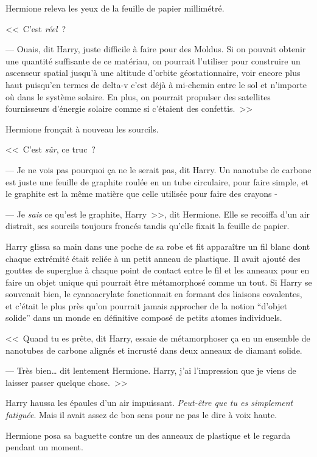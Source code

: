 Hermione releva les yeux de la feuille de papier millimétré.

<<~C'est \emph{réel}~?

--- Ouais, dit Harry, juste difficile à faire pour des Moldus. Si on pouvait obtenir une quantité suffisante de ce matériau, on pourrait l'utiliser pour construire un ascenseur spatial jusqu'à une altitude d'orbite géostationnaire, voir encore plus haut puisqu'en termes de delta-v c'est déjà à mi-chemin entre le sol et n'importe où dans le système solaire. En plus, on pourrait propulser des satellites fournisseurs d'énergie solaire comme si c'étaient des confettis.~>>

Hermione fronçait à nouveau les sourcils.

<<~C'est \emph{sûr}, ce truc~?

--- Je ne vois pas pourquoi ça ne le serait pas, dit Harry. Un nanotube de carbone est juste une feuille de graphite roulée en un tube circulaire, pour faire simple, et le graphite est la même matière que celle utilisée pour faire des crayons -

--- Je \emph{sais} ce qu'est le graphite, Harry~>>, dit Hermione. Elle se recoiffa d'un air distrait, ses sourcils toujours froncés tandis qu'elle fixait la feuille de papier.

Harry glissa sa main dans une poche de sa robe et fit apparaître un fil blanc dont chaque extrémité était reliée à un petit anneau de plastique. Il avait ajouté des gouttes de superglue à chaque point de contact entre le fil et les anneaux pour en faire un objet unique qui pourrait être métamorphosé comme un tout. Si Harry se souvenait bien, le cyanoacrylate fonctionnait en formant des liaisons covalentes, et c'était le plus près qu'on pourrait jamais approcher de la notion “d'objet solide” dans un monde en définitive composé de petits atomes individuels.

<<~Quand tu es prête, dit Harry, essaie de métamorphoser ça en un ensemble de nanotubes de carbone alignés et incrusté dans deux anneaux de diamant solide.

--- Très bien… dit lentement Hermione. Harry, j'ai l'impression que je viens de laisser passer quelque chose.~>>

Harry haussa les épaules d'un air impuissant. \emph{Peut-être que tu es simplement fatiguée}. Mais il avait assez de bon sens pour ne pas le dire à voix haute.

Hermione posa sa baguette contre un des anneaux de plastique et le regarda pendant un moment.

